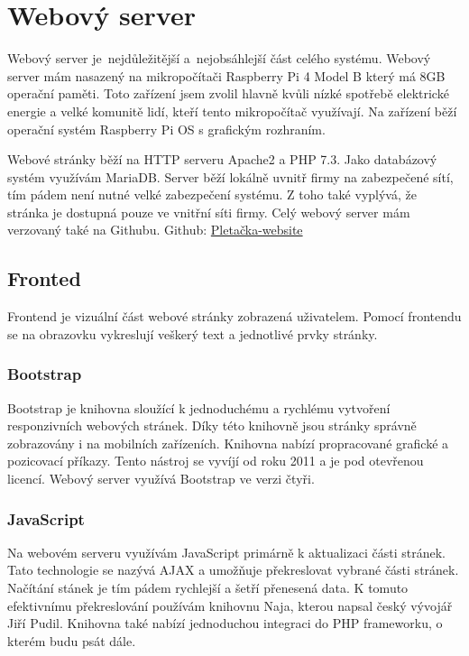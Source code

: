 \chapter{Webový server}
Webový server je~nejdůležitější a~nejobsáhlejší část celého systému. 
Webový server mám nasazený na mikropočítači Raspberry Pi 4 Model B který má 8GB operační paměti.
Toto zařízení jsem zvolil hlavně kvůli nízké spotřebě elektrické energie a velké komunitě lidí, kteří tento mikropočítač využívají.
Na zařízení běží operační systém Raspberry Pi OS s grafickým rozhraním.

Webové stránky běží na HTTP serveru Apache2 a PHP 7.3.
Jako databázový systém využívám MariaDB.
Server běží lokálně uvnitř firmy na zabezpečené sítí, tím pádem není nutné velké zabezpečení systému.
Z toho také vyplývá, že stránka je dostupná pouze ve vnitřní síti firmy.  
Celý webový server mám verzovaný také na Githubu.\newline
Github: \href{https://github.com/Pletacka-IoT/Pletacka-website}{Pletačka-website} 

\section{Fronted}
 
Frontend je vizuální část webové stránky zobrazená uživatelem.
Pomocí frontendu se na obrazovku vykreslují veškerý text a jednotlivé prvky stránky.

\subsection{Bootstrap}
Bootstrap je knihovna sloužící k jednoduchému a rychlému vytvoření responzivních webových stránek.
Díky této knihovně jsou stránky správně zobrazovány i na mobilních zařízeních.
Knihovna nabízí propracované grafické a pozicovací příkazy.
Tento nástroj se vyvíjí od roku 2011 a je pod otevřenou licencí.
Webový server využívá Bootstrap ve verzi čtyři.


\subsection{JavaScript}
Na webovém serveru využívám JavaScript primárně k aktualizaci části stránek.
Tato technologie se nazývá AJAX a umožňuje překreslovat vybrané části stránek.
Načítání stánek je tím pádem rychlejší a šetří přenesená data.
K tomuto efektivnímu překreslování používám knihovnu Naja\cite{NAJA}, kterou napsal český vývojář Jiří Pudil.
Knihovna také nabízí jednoduchou integraci do PHP frameworku, o kterém budu psát dále.   




